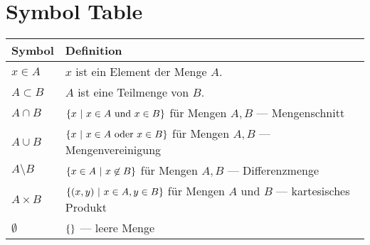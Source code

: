 \documentclass[crop=false,10pt,ngerman]{standalone}
\begin{document}
  \section*{Symbol Table}

  \renewcommand{\arraystretch}{1.3}
  \begin{table}[H]
    \scriptsize
    \begin{tabularx}{\textwidth}{p{}p{}}
      \hline
      \textbf{Symbol} & \textbf{Definition} \\
      \hline
      \hline

      $x\in A$ & $x$ ist ein Element der Menge $A$. \\

      $A\subset B$ & $A$ ist eine Teilmenge von $B$. \\

      $A\cap B$ & $\set{x}{x\in A \text{ und } x\in B}$ für Mengen $A,B$ --- Mengenschnitt \\

      $A\cup B$ & $\set{x}{x\in A \text{ oder } x\in B}$ für Mengen $A,B$ --- Mengenvereinigung \\

      $A\setminus B$ & $\set{x\in A}{x\not\in B}$ für Mengen $A,B$ --- Differenzmenge \\

      $A\times B$ & $\set{(x,y)}{x\in A,y\in B}$ für Mengen $A$ und $B$ --- kartesisches Produkt \\

      $\emptyset$ & $\set{}{}$ --- leere Menge \\


\end{tabularx}
\end{table}
\end{document}
